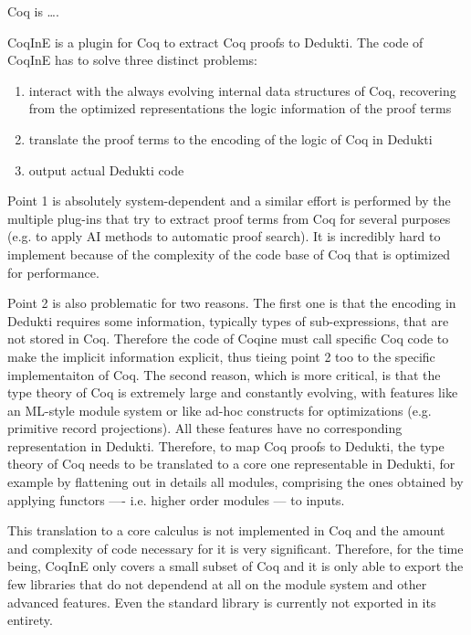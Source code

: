

Coq is \ldots{}.

CoqInE is a plugin for Coq to extract Coq proofs to Dedukti. The code of CoqInE has to solve three distinct problems:
\begin{enumerate}
 \item interact with the always evolving internal data structures of Coq, recovering from the optimized representations the logic information of the proof terms
 \item translate the proof terms to the encoding of the logic of Coq in Dedukti
 \item output actual Dedukti code
\end{enumerate}

Point 1 is absolutely system-dependent and a similar effort is performed by the multiple plug-ins that try to extract proof terms from Coq for several purposes (e.g. to apply AI methods to automatic proof search). It is incredibly hard to implement because of the complexity of the code base of Coq that is optimized for performance.

Point 2 is also problematic for two reasons. The first one is that the encoding in Dedukti requires some information, typically types of sub-expressions, that are not stored in Coq. Therefore the code of Coqine must call specific Coq code to make the implicit information explicit, thus tieing point 2 too to the specific implementaiton of Coq. The second reason, which is more critical, is that the type theory of Coq is extremely large and constantly evolving, with features like an ML-style module system or like ad-hoc constructs for optimizations (e.g. primitive record projections). All these features have no corresponding representation in Dedukti. Therefore, to map Coq proofs to Dedukti, the type theory of Coq needs to be translated to a core one representable in Dedukti, for example by flattening out in details all modules, comprising the ones obtained by applying functors ---- i.e. higher order modules --- to inputs.

This translation to a core calculus is not implemented in Coq and the amount and complexity of code necessary for it is very significant. Therefore, for the time being, CoqInE only covers a small subset of Coq and it is only able to export the few libraries that do not dependend at all on the module system and other advanced features. Even the standard library is currently not exported in its entirety.

